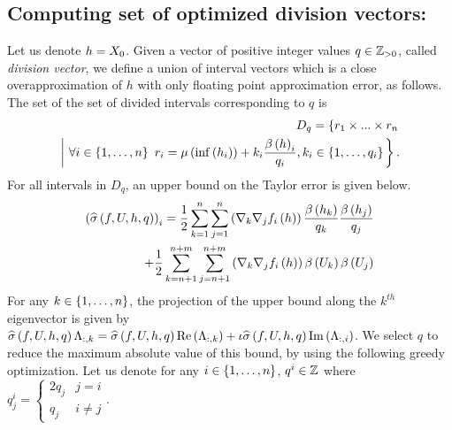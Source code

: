 \subsection{Computing set of optimized division vectors:}
Let us denote $h=X_0$.  Given a vector of positive integer
values $q\in\mathbb{Z}_{>0}$, called \emph{division vector}, we define
a union of interval vectors which is a close overapproximation of $h$
with only floating point approximation error, as follows.  The set of
the set of divided intervals corresponding to $q$ is
%
\begin{align*}
D_q
= \left\{r_1\times...\times r_n\right.\\
 \left.\left|~\forall i\in\left\{1,\ldots,n\right\}~r_i
= \mu\left(\inf\left(h_i\right)\right)+k_i\frac{\beta\left(h\right)_i}{q_i}, k_i\in\left\{1,\ldots,q_i\right\}\right.\right\}.
\end{align*}
%
For all intervals in $D_q$, an upper bound on the Taylor error is
given below.
%
\begin{align*}
\left(\widehat{\sigma}\left(f,U,h,q\right)\right)_i
= \frac{1}{2}\sum_{k=1}^{n}\sum_{j=1}^{n}\left(\nabla_k\nabla_j{f_i}\left(h\right)\right)\frac{\beta\left(h_k\right)}{q_k}\frac{\beta\left(h_j\right)}{q_j}
\\
+ \frac{1}{2}\sum_{k=n+1}^{n+m}\sum_{j=n+1}^{n+m}\left(\nabla_k\nabla_j{f_i}\left(h\right)\right)\beta\left(U_k\right)\beta\left(U_j\right)
\end{align*}
%
For any $k\in\left\{1,\ldots,n\right\}$, the projection of the upper bound
along the $k^{th}$ eigenvector is given by
$\widehat{\sigma}\left(f,U,h,q\right)\Lambda_{:,k}
= \widehat{\sigma}\left(f,U,h,q\right)\operatorname{Re}\left(\Lambda_{:,k}\right)
+ \iota\widehat{\sigma}\left(f,U,h,q\right)\operatorname{Im}\left(\Lambda_{:,i}\right)$.  We select $q$ to
reduce the maximum absolute value of this bound, by using the
following greedy optimization.  Let us denote for any
$i\in\left\{1,\ldots,n\right\}$, ${q}^i\in\mathbb{Z}$ where ${q}^i_j
= \begin{cases}2q_j & j=i\\ q_j & i\neq j \end{cases}$.

